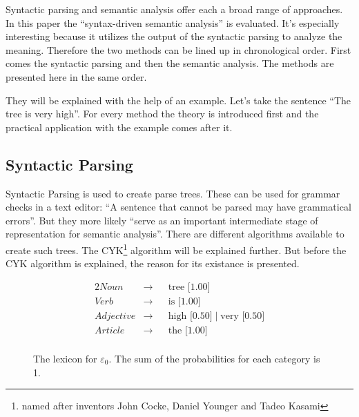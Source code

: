 \documentclass[12pt,twoside]{scrartcl}
\theoremstyle{plain}
\theoremstyle{definition}
\theoremstyle{remark}
\begin{document}
	Syntactic parsing and semantic analysis offer each a broad range of approaches. In this paper the ``syntax-driven semantic analysis''\cite[p.~617]{Jurafsky2009} is evaluated. It's especially interesting because it utilizes the output of the syntactic parsing to analyze the meaning. Therefore the two methods can be lined up in chronological order. First comes the syntactic parsing and then the semantic analysis. The methods are presented here in the same order. 
	
	They will be explained with the help of an example. Let's take the sentence ``The tree is very high''. For every method the theory is introduced first and the practical application with the example comes after it.
	
	\subsection{Syntactic Parsing}
	\label{subSec:syntacticParsing}
		Syntactic Parsing is used to create parse trees. These can be used for grammar checks in a text editor: ``A sentence that cannot be parsed may have grammatical errors''\cite[p.~461]{Jurafsky2009b}. But they more likely ``serve as an important intermediate stage of representation for semantic analysis''\cite[p.~461]{Jurafsky2009b}. There are different algorithms available to create such trees. The CYK\footnote{named after inventors John Cocke, Daniel Younger and Tadeo Kasami\cite[p.~893]{Russel2010}} algorithm will be explained further. But before the CYK algorithm is explained, the reason for its existance is presented.
		
		\begin{figure}
			\begin{alignat*}{2}
				Noun &\rightarrow && \text{tree [1.00]} \\
				Verb &\rightarrow && \text{is [1.00]} \\
				Adjective &\rightarrow && \text{high [0.50]} \;|\; \text{very [0.50]} \\
				Article &\rightarrow && \text{the [1.00]} \\
			\end{alignat*}
			\caption{The lexicon for $\varepsilon_{0}$. The sum of the probabilities for each category is 1.}
			\label{fig:lexicon}
		\end{figure}
		
\end{document}
